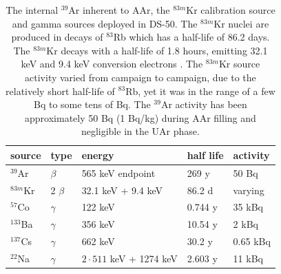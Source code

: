 \begin{table}[htbp]
\centering
\caption{The internal $^{39}$Ar inherent to AAr, the $^{83m}$Kr calibration source and gamma sources deployed in DS-50. The $^{83m}$Kr nuclei are produced in decays of $^{83}$Rb which has a half-life of 86.2 days. The $^{83m}$Kr decays with a half-life of 1.8 hours, emitting 32.1 keV and 9.4 keV conversion electrons \cite{Lippincott:2010jb}. The $^{83m}$Kr source activity varied from campaign to campaign, due to the relatively short half-life of $^{83}$Rb, yet it was in the range of a few Bq to some tens of Bq. The $^{39}$Ar activity has been approximately 50 Bq (1 Bq/kg) during AAr filling and negligible in the UAr phase.}
\centering
\begin{tabular}{|l|l|l|l|l|}
\hline
\textbf{source} & \textbf{type} & \textbf{energy} & \textbf{half life} & \textbf{activity} \\ \hline
$^{39}$Ar & $\beta$ &  565 keV endpoint& 269 y  & 50 Bq\\ \hline
$^{83m}$Kr & 2 $\beta$ &  32.1 keV + 9.4 keV & 86.2 d & varying\\ \hline\hline
$^{57}$Co & $\gamma$ & 122 keV & 0.744 y  & 35 kBq \\ \hline
$^{133}$Ba & $\gamma$ & 356 keV & 10.54 y & 2 kBq \\ \hline
$^{137}$Cs & $\gamma$ & 662 keV & 30.2 y & 0.65 kBq \\ \hline
$^{22}$Na & $\gamma$ & $2\cdot 511$ keV + 1274 keV & 2.603 y & 11 kBq \\ \hline
\end{tabular}
\label{tbl:GammaSources}
\end{table}


